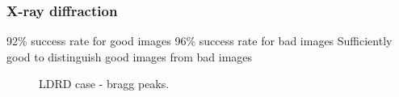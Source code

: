 \subsubsection{X-ray diffraction}\label{subsec:diffraction} %
92\% success rate for good images
96\% success rate for bad images
Sufficiently good to distinguish good images from bad images

\begin{figure}[!t]
\centering
{}
\hfil
{}
\caption{LDRD case - bragg peaks.}
\label{fig:ldrd}
\end{figure}

